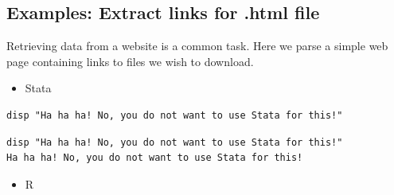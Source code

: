 \documentclass[]{book}
\newenvironment{Shaded}{\begin{snugshade}}{\end{snugshade}}
\newcommand{\KeywordTok}[1]{\textcolor[rgb]{0.13,0.29,0.53}{\textbf{#1}}}
\newcommand{\DataTypeTok}[1]{\textcolor[rgb]{0.13,0.29,0.53}{#1}}
\newcommand{\CharTok}[1]{\textcolor[rgb]{0.31,0.60,0.02}{#1}}
\newcommand{\StringTok}[1]{\textcolor[rgb]{0.31,0.60,0.02}{#1}}
\newcommand{\OtherTok}[1]{\textcolor[rgb]{0.56,0.35,0.01}{#1}}
\newcommand{\NormalTok}[1]{#1}
\providecommand{\tightlist}{%
  \setlength{\itemsep}{0pt}\setlength{\parskip}{0pt}}
\begin{document}
\subsection{Examples: Extract links for .html
file}\label{examples-extract-links-for-.html-file}

Retrieving data from a website is a common task. Here we parse a simple
web page containing links to files we wish to download.

\begin{itemize}
\tightlist
\item
  Stata
\end{itemize}

\begin{verbatim}
disp "Ha ha ha! No, you do not want to use Stata for this!"
\end{verbatim}

\begin{verbatim}
disp "Ha ha ha! No, you do not want to use Stata for this!"
Ha ha ha! No, you do not want to use Stata for this!
\end{verbatim}

\begin{itemize}
\tightlist
\item
  R
\end{itemize}

\begin{Shaded}
\end{Shaded}
\end{document}
